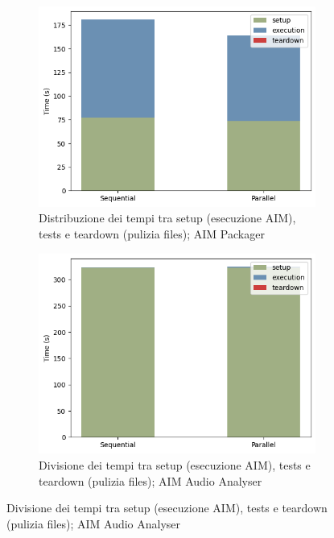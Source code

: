 \begin{figure}[h]
     \centering
     \begin{subfigure}{0.49\textwidth}
         \centering
         \includegraphics[width=\textwidth]{img/packager-stacked-bar-graph.png}
         \caption{Distribuzione dei tempi tra setup (esecuzione \ac{AIM}), tests e teardown (pulizia files); \ac{AIM} Packager}
         \label{fig:grafico-distribuzione-tempo-packager}
     \end{subfigure}
     \hfill
     \begin{subfigure}{0.49\textwidth}
         \centering
         \includegraphics[width=\textwidth]{img/audioanalyser-stacked-bar-graph.png}
         \caption{Divisione dei tempi tra setup (esecuzione \ac{AIM}), tests e teardown (pulizia files); \ac{AIM} Audio Analyser}

\end{subfigure}
\end{figure}
